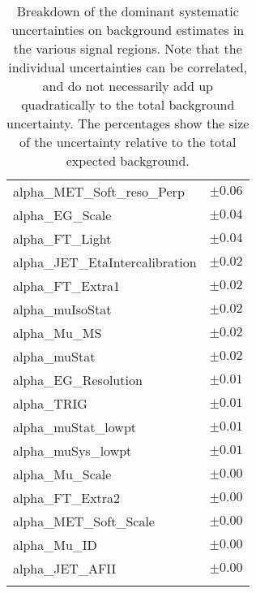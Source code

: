 \begin{table}
\begin{center}
\begin{tabular*}{\textwidth}{@{\extracolsep{\fill}}lc}
alpha\_MET\_Soft\_reso\_Perp         & $\pm 0.06$       \\
alpha\_EG\_Scale         & $\pm 0.04$       \\
alpha\_FT\_Light         & $\pm 0.04$       \\
alpha\_JET\_EtaIntercalibration         & $\pm 0.02$       \\
alpha\_FT\_Extra1         & $\pm 0.02$       \\
alpha\_muIsoStat         & $\pm 0.02$       \\
alpha\_Mu\_MS         & $\pm 0.02$       \\
alpha\_muStat         & $\pm 0.02$       \\
alpha\_EG\_Resolution         & $\pm 0.01$       \\
alpha\_TRIG         & $\pm 0.01$       \\
alpha\_muStat\_lowpt         & $\pm 0.01$       \\
alpha\_muSys\_lowpt         & $\pm 0.01$       \\
alpha\_Mu\_Scale         & $\pm 0.00$       \\
alpha\_FT\_Extra2         & $\pm 0.00$       \\
alpha\_MET\_Soft\_Scale         & $\pm 0.00$       \\
alpha\_Mu\_ID         & $\pm 0.00$       \\
alpha\_JET\_AFII         & $\pm 0.00$       \\
\noalign{\smallskip}\hline\noalign{\smallskip}
\end{tabular*}
\end{center}
\caption[Breakdown of uncertainty on background estimates]{
Breakdown of the dominant systematic uncertainties on background estimates in the various signal regions.
Note that the individual uncertainties can be correlated, and do not necessarily add up quadratically to 
the total background uncertainty. The percentages show the size of the uncertainty relative to the total expected background.
\label{table.results.bkgestimate.uncertainties.SR3L1b1}}
\end{table}
\clearpage
%